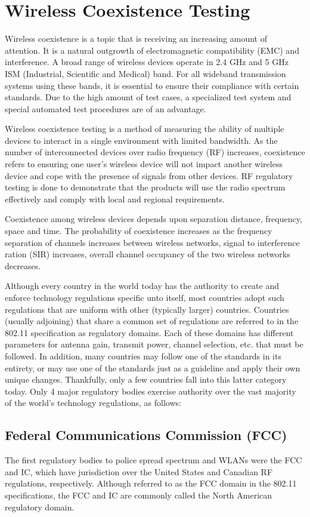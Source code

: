 \section{Wireless Coexistence Testing  } 
Wireless coexistence is a topic that is receiving an increasing amount of attention. It is a natural outgrowth of electromagnetic compatibility (EMC) and interference. A broad range of wireless devices operate in 2.4 GHz and 5 GHz ISM (Industrial, Scientific and Medical) band. For all wideband transmission systems using these bands, it is essential to ensure their compliance with certain standards. Due to the high amount of test cases, a specialized test system and special automated test procedures are of an advantage.

Wireless coexistence testing is a method of measuring the ability of multiple devices to interact in a single environment with limited bandwidth.  As the number of interconnected devices over radio frequency (RF) increases, coexistence refers to ensuring one user's wireless device will not impact another wireless device and cope with the presence of signals from other devices. RF regulatory testing is done to demonstrate that the products will use the radio spectrum effectively and comply with local and regional requirements. 

Coexistence among wireless devices depends upon separation distance, frequency, space and time. The probability of coexistence increases as the frequency separation of channels increases between wireless networks, signal to interference ration (SIR) increases, overall channel occupancy of the two wireless networks decreases. 

Although every country in the world today has the authority to create and enforce technology regulations specific unto itself, most countries adopt such regulations that are uniform with other (typically larger) countries. Countries (usually adjoining) that share a common set of regulations are referred to in the 802.11 specification as regulatory domains. Each of these domains has different parameters for antenna gain, transmit power, channel selection, etc. that must be followed. In addition, many countries may follow one of the standards in its entirety, or may use one of the standards just as a guideline and apply their own unique changes. Thankfully, only a few countries fall into this latter category today. Only 4 major regulatory bodies exercise authority over the vast majority of the world's technology regulations, as follows:

\subsection{Federal Communications Commission (FCC)}
The first regulatory bodies to police spread spectrum and WLANs were the FCC and IC, which have jurisdiction over the United States and Canadian RF regulations, respectively. Although referred to as the FCC domain in the 802.11 specifications, the FCC and IC are commonly called the North American regulatory domain.

